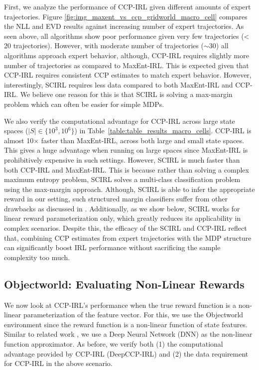 \documentclass{article}
\begin{document}
First, we analyze the performance of CCP-IRL given different amounts of expert trajectories.
Figure \ref{fig:img_maxent_vs_ccp_gridworld_macro_cell} compares the NLL and EVD results against increasing number of expert trajectories.
As seen above, all algorithms show poor performance given very few trajectories (< 20 trajectories).
However, with moderate number of trajectories ($\sim$30) all algorithms approach expert behavior, although, CCP-IRL requires slightly more number of trajectories as compared to MaxEnt-IRL. This is expected given that CCP-IRL requires consistent CCP estimates to match expert behavior. However, interestingly, SCIRL requires less data compared to both MaxEnt-IRL and CCP-IRL. We believe one reason for this is that SCIRL is solving a max-margin problem which can often be easier for simple MDPs. 

We also verify the computational advantage for CCP-IRL across large state spaces ($|S| \in \{10^3, 10^6\}$) in Table~\ref{table:table_results_macro_cells}. CCP-IRL is almost 10$\times$ faster than MaxEnt-IRL, across both large and small state spaces. This gives a huge advantage when running on large spaces since MaxEnt-IRL is prohibitively expensive in such settings. However, SCIRL is much faster than both CCP-IRL and MaxEnt-IRL. This is because rather than solving a complex maximum entropy problem, SCIRL solves a multi-class classification problem using the max-margin approach. Although, SCIRL is able to infer the appropriate reward in our setting, such structured margin classifiers suffer from other drawbacks as discussed in \cite{ziebart2010modeling}. Additionally, as we show below, SCIRL works for linear reward parameterization only, which greatly reduces its applicability in complex scenarios. Despite this, the efficacy of the SCIRL and CCP-IRL reflect that, combining CCP estimates from expert trajectories with the MDP structure can significantly boost IRL performance without sacrificing the sample complexity too much. 

\subsection{Objectworld: Evaluating Non-Linear Rewards}

We now look at CCP-IRL's performance when the true reward function is a non-linear parameterization of the feature vector.
For this, we use the Objectworld \cite{levine2011nonlinear} environment since the reward function is a non-linear function of state features.
Similar to related work \cite{wulfmeier2015maximum}, we use a Deep Neural Network (DNN) as the non-linear function approximator.
As before, we verify both (1) the computational advantage provided by CCP-IRL (DeepCCP-IRL) and (2) the data requirement for CCP-IRL in the above scenario.
\end{document}
